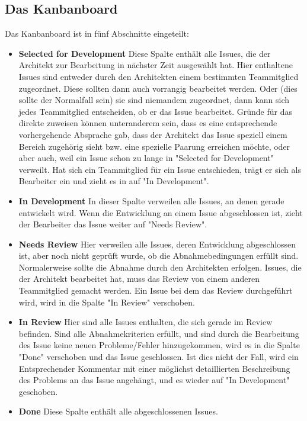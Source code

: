 \subsection{Das Kanbanboard}
Das Kanbanboard ist in fünf Abschnitte eingeteilt:
\begin{itemize}
	\item \textbf{Selected for Development} \newline
	Diese Spalte enthält alle Issues, die der Architekt zur Bearbeitung in nächster Zeit ausgewählt hat. Hier enthaltene Issues sind entweder durch den Architekten einem bestimmten Teammitglied zugeordnet. Diese sollten dann auch vorrangig bearbeitet werden. Oder (dies sollte der Normalfall sein) sie sind niemandem zugeordnet, dann kann sich jedes Teammitglied entscheiden, ob er das Issue bearbeitet. Gründe für das direkte zuweisen können unteranderem sein, dass es eine entsprechende vorhergehende Absprache gab, dass der Architekt das Issue speziell einem Bereich zugehörig sieht bzw. eine spezielle Paarung erreichen möchte, oder aber auch, weil ein Issue schon zu lange in "Selected for Development" verweilt. Hat sich ein Teammitglied für ein Issue entschieden, trägt er sich als Bearbeiter ein und zieht es in auf "In Development".
	\item \textbf{In Development} \newline
	In dieser Spalte verweilen alle Issues, an denen gerade entwickelt wird. Wenn die Entwicklung an einem Issue abgeschlossen ist, zieht der Bearbeiter das Issue weiter auf "Needs Review".
	\item \textbf{Needs Review} \newline
	Hier verweilen alle Issues, deren Entwicklung abgeschlossen ist, aber noch nicht geprüft wurde, ob die Abnahmebedingungen erfüllt sind. Normalerweise sollte die Abnahme durch den Architekten erfolgen. Issues, die der Architekt bearbeitet hat, muss das Review von einem anderen Teammitglied gemacht werden. Ein Issue bei dem das Review durchgeführt wird, wird in die Spalte "In Review" verschoben.
	\item \textbf{In Review} \newline
	Hier sind alle Issues enthalten, die sich gerade im Review befinden. Sind alle Abnahmekriterien erfüllt, und sind durch die Bearbeitung des Issue keine neuen Probleme/Fehler hinzugekommen, wird es in die Spalte "Done" verschoben und das Issue geschlossen. Ist dies nicht der Fall, wird ein Entsprechender Kommentar mit einer möglichst detaillierten Beschreibung des Problems an das Issue angehängt, und es wieder auf "In Development" geschoben.
	\item \textbf{Done} \newline
	Diese Spalte enthält alle abgeschlossenen Issues.
\end{itemize}

